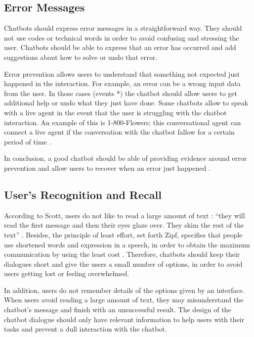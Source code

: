 \documentclass[a4paper,10pt]{article}
\begin{document}
\subsection*{Error Messages}

Chatbots should express error messages in a straightforward way. They should not use codes or technical words in order to avoid confusing and stressing the user. Chatbots should be able to express that an error has occurred and add suggestions about how to solve or undo that error. 

Error prevention allows users to understand that something not expected just happened in the interaction. For example, an error can be a wrong input data from the user. In those cases (events *) the chatbot should allow users to get additional help or undo what they just have done. Some chatbots  allow to speak with a live agent in the event that the user is struggling with the chatbot interaction. An example of this is 1-800-Flowers; this conversational agent can connect a live agent if the conversation with the chatbot fallow for a certain period of time \cite{1-800-Flowers}. 

In conclusion, a good chatbot should be able of providing evidence around error prevention and allow users to recover when an error just happened \cite{HeuristicsWebPage}. 

\subsection*{User's Recognition and Recall}

According to Scott, users do not like to read a large amount of text : ``they will read the first message and then their eyes glaze over. They skim the rest of the text” \cite{HeuristicsWebPage}. Besides, the principle of least effort, set forth Zipf, specifies that people use shortened words and expression in a speech, in order to obtain the maximum communication by using the least cost \cite{allen1978conversation}. Therefore, chatbots should keep their dialogues short and give the users a small number of options, in order to avoid users getting lost or feeling overwhelmed.

In addition, users do not remember details of the options given by an interface. When users avoid reading a large amount of text, they may misunderstand the chatbot’s message and finish with an unsuccessful result. The design of the chatbot dialogue should only have relevant information to help users with their tasks and prevent a dull interaction with the chatbot. 
\end{document}
